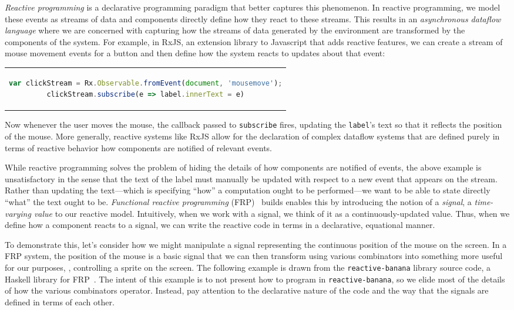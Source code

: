 \emph{Reactive programming} is a declarative programming paradigm that better captures this phenomenon.
In reactive programming, we model these events as streams of data and components directly define how they react to these streams.
This results in an \emph{asynchronous dataflow language} where we are concerned with capturing how the streams of data generated by the environment are transformed by the components of the system.
For example, in RxJS, an extension library to Javascript that adds reactive features, we can create a stream of mouse movement events for a button and then define how the system reacts to updates about that event:
\begin{center}\begin{tabular}{c}\begin{lstlisting}[language=Javascript]
var clickStream = Rx.Observable.fromEvent(document, 'mousemove');
clickStream.subscribe(e => label.innerText = e)
\end{lstlisting}\end{tabular}\end{center}
Now whenever the user moves the mouse, the callback passed to \verb+subscribe+ fires, updating the \verb+label+'s text so that it reflects the position of the mouse.
More generally, reactive systems like RxJS allow for the declaration of complex dataflow systems that are defined purely in terms of reactive behavior how components are notified of relevant events.

While reactive programming solves the problem of hiding the details of how components are notified of events, the above example is unsatisfactory in the sense that the text of the label must manually be updated with respect to a new event that appears on the stream.
Rather than updating the text---which is specifying ``how'' a computation ought to be performed---we want to be able to state directly ``what'' the text ought to be.
\emph{Functional reactive programming} (FRP)~\cite{elliott1997, czaplicki2013, finkbeiner2019, jeffrey2012} builds enables this by introducing the notion of a \emph{signal}, a \emph{time-varying value} to our reactive model.
Intuitively, when we work with a signal, we think of it as a continuously-updated value.
Thus, when we define how a component reacts to a signal, we can write the reactive code in terms in a declarative, equational manner.

To demonstrate this, let's consider how we might manipulate a signal representing the continuous position of the mouse on the screen.
In a FRP system, the position of the mouse is a basic signal that we can then transform using various combinators into something more useful for our purposes, \eg, controlling a sprite on the screen.
The following example is drawn from the \texttt{reactive-banana} library source code, a Haskell library for FRP~\cite{reactive-banana}.
The intent of this example is to not present how to program in \texttt{reactive-banana}, so we elide most of the details of how the various combinators operator.
Instead, pay attention to the declarative nature of the code and the way that the signals are defined in terms of each other.

